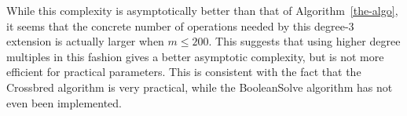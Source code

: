\documentclass[a4paper,UKenglish,cleveref, autoref]{lipics-v2019}
\begin{document}
While this complexity is asymptotically better than that of
Algorithm~\ref{the-algo}, it seems that the concrete number of operations needed
by this degree-3 extension is actually larger when $m \leq 200$.  This suggests
that using higher degree multiples in this fashion gives a better asymptotic
complexity, but is not more efficient for practical parameters. This is
consistent with the fact that the \textsf{Crossbred} algorithm is very
practical, while the \textsf{BooleanSolve} algorithm has not even been
implemented.


\end{document}
